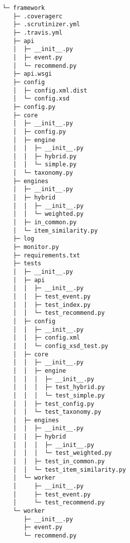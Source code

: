 \begin{codebox}
\begin{verbatim}
└─ framework
   ├─ .coveragerc
   ├─ .scrutinizer.yml
   ├─ .travis.yml
   ├─ api
   │  ├─ __init__.py
   │  ├─ event.py
   │  └─ recommend.py
   ├─ api.wsgi
   ├─ config
   │  ├─ config.xml.dist
   │  └─ config.xsd
   ├─ config.py
   ├─ core
   │  ├─ __init__.py
   │  ├─ config.py
   │  ├─ engine
   │  │  ├─ __init__.py
   │  │  ├─ hybrid.py
   │  │  └─ simple.py
   │  └─ taxonomy.py
   ├─ engines
   │  ├─ __init__.py
   │  ├─ hybrid
   │  │  ├─ __init__.py
   │  │  └─ weighted.py
   │  ├─ in_common.py
   │  └─ item_similarity.py
   ├─ log
   ├─ monitor.py
   ├─ requirements.txt
   ├─ tests
   │  ├─ __init__.py
   │  ├─ api
   │  │  ├─ __init__.py
   │  │  ├─ test_event.py
   │  │  ├─ test_index.py
   │  │  └─ test_recommend.py
   │  ├─ config
   │  │  ├─ __init__.py
   │  │  ├─ config.xml
   │  │  └─ config_xsd_test.py
   │  ├─ core
   │  │  ├─ __init__.py
   │  │  ├─ engine
   │  │  │  ├─ __init__.py
   │  │  │  ├─ test_hybrid.py
   │  │  │  └─ test_simple.py
   │  │  ├─ test_config.py
   │  │  └─ test_taxonomy.py
   │  ├─ engines
   │  │  ├─ __init__.py
   │  │  ├─ hybrid
   │  │  │  ├─ __init__.py
   │  │  │  └─ test_weighted.py
   │  │  ├─ test_in_common.py
   │  │  └─ test_item_similarity.py
   │  └─ worker
   │     ├─ __init__.py
   │     ├─ test_event.py
   │     └─ test_recommend.py
   └─ worker
      ├─ __init__.py
      ├─ event.py
      └─ recommend.py

\end{verbatim}
\end{codebox}

